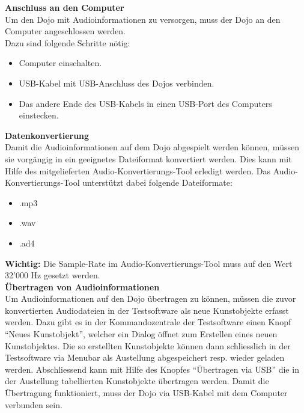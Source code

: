 \label{datenaustauschkapitel} 
\textbf{Anschluss an den Computer}
\\[4mm]
Um den Dojo mit Audioinformationen zu versorgen, muss der Dojo an den Computer angeschlossen werden.
\\[4mm]
Dazu sind folgende Schritte nötig:
\begin{itemize}
\item Computer einschalten.
\end{itemize}
\begin{itemize}
\item USB-Kabel mit USB-Anschluss des Dojos verbinden.
\end{itemize}
\begin{itemize}
\item Das andere Ende des USB-Kabels in einen USB-Port des Computers einstecken.
\end{itemize}
\textbf{Datenkonvertierung}
\\[4mm]
Damit die Audioinformationen auf dem Dojo abgespielt werden können, müssen sie vorgängig in ein geeignetes Dateiformat konvertiert werden. Dies kann mit Hilfe des mitgelieferten Audio-Konvertierungs-Tool erledigt werden. Das Audio-Konvertierungs-Tool unterstützt dabei folgende Dateiformate:
\begin{itemize}
\item .mp3
\end{itemize}
\begin{itemize}
\item .wav
\end{itemize}
\begin{itemize}
\item .ad4
\end{itemize}
\textbf{Wichtig:} Die Sample-Rate im Audio-Konvertierungs-Tool muss auf den Wert 32'000 Hz gesetzt werden.
\\[4mm]
\textbf{Übertragen von Audioinformationen}
\\[4mm]
Um Audioinformationen auf den Dojo übertragen zu können, müssen die zuvor konvertierten Audiodateien in der Testsoftware als neue Kunstobjekte erfasst werden. Dazu gibt es in der Kommandozentrale der Testsoftware einen Knopf ``Neues Kunstobjekt'', welcher ein Dialog öffnet zum Erstellen eines neuen Kunstobjektes. Die so erstellten Kunstobjekte können dann schliesslich in der Testsoftware via Menubar als Austellung abgespeichert resp. wieder geladen werden. Abschliessend kann mit Hilfe des Knopfes ``Übertragen via USB'' die in der Austellung tabellierten Kunstobjekte übertragen werden. Damit die Übertragung funktioniert, muss der Dojo via USB-Kabel mit dem Computer verbunden sein.
